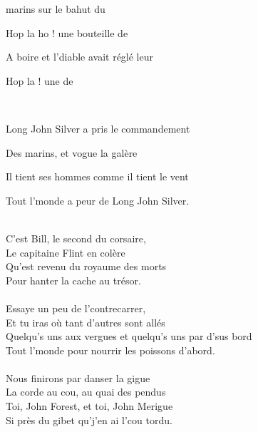 \begin{SBChorus}
 marins sur le bahut du 

Hop la ho ! une bouteille de 

A boire et l'diable avait réglé leur 

Hop la  ! une  de 
\end{SBChorus}
~\\
\begin{SBVerse}
Long John Silver a pris le commandement

Des marins, et vogue la galère

Il tient ses hommes comme il tient le vent

Tout l'monde a peur de Long John Silver.
\end{SBVerse}
~\\
C'est Bill, le second du corsaire,\\
Le capitaine Flint en colère\\
Qu'est revenu du royaume des morts\\
Pour hanter la cache au trésor.\\
~\\
Essaye un peu de l'contrecarrer,\\
Et tu iras où tant d'autres sont allés\\ 
Quelqu's uns aux vergues et quelqu's uns par d'sus bord\\ 
Tout l'monde pour nourrir les poissons d'abord.\\
~\\
Nous finirons par danser la gigue\\
La corde au cou, au quai des pendus\\
Toi, John Forest, et toi, John Merigue\\ 
Si près du gibet qu'j'en ai l'cou tordu.\\
